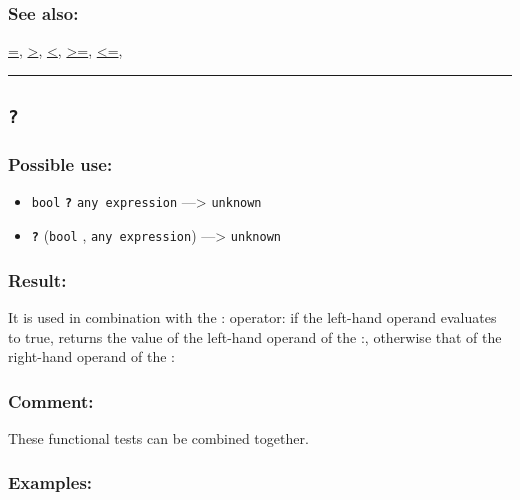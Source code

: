\documentclass[]{book}
\providecommand{\tightlist}{%
  \setlength{\itemsep}{0pt}\setlength{\parskip}{0pt}}
\theoremstyle{definition}
\theoremstyle{definition}
\theoremstyle{definition}
\theoremstyle{remark}
\begin{document}
\subsubsection{See also:}\label{see-also-3}

\href{OperatorsAA\#=}{=}, \href{OperatorsAA\#\%3E}{\textgreater{}},
\href{OperatorsAA\#\%3C}{\textless{}},
\href{OperatorsAA\#\%3E=}{\textgreater{}=},
\href{OperatorsAA\#\%3C=}{\textless{}=},

\begin{center}\rule{0.5\linewidth}{\linethickness}\end{center}

\subsection{\texorpdfstring{\texttt{?}}{?}}\label{section-6}

\subsubsection{Possible use:}\label{possible-use-5}

\begin{itemize}
\tightlist
\item
  \texttt{bool} \textbf{\texttt{?}} \texttt{any\ expression}
  ---\textgreater{} \texttt{unknown}
\item
  \textbf{\texttt{?}} (\texttt{bool} , \texttt{any\ expression})
  ---\textgreater{} \texttt{unknown}
\end{itemize}

\subsubsection{Result:}\label{result-4}

It is used in combination with the : operator: if the left-hand operand
evaluates to true, returns the value of the left-hand operand of the :,
otherwise that of the right-hand operand of the :

\subsubsection{Comment:}\label{comment-1}

These functional tests can be combined together.

\subsubsection{Examples:}\label{examples-3}
\end{document}
